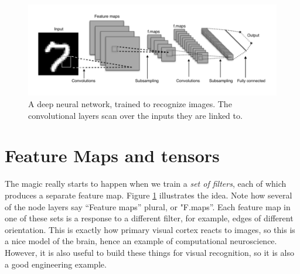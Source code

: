


\begin{figure}[h]
\centering
\includegraphics[scale=.45]{./images/deepNet.png}
\caption[Adapted from a creative commons image by Aphex34 at \url{https://commons.wikimedia.org/wiki/File:Typical_cnn.png} ]{A deep neural network, trained to recognize images. The convolutional layers scan over the inputs they are linked to. }
\label{deep_net2}
\end{figure}


\section{Feature Maps and tensors}

The magic really starts to happen when we train a \emph{set of filters}, each of which produces a separate feature map.  Figure \ref{deep_net2} illustrates the idea. Note how several of the node layers say ``Feature maps'' plural, or "F.maps''. Each feature map in one of these sets is a response to a different filter, for example, edges of different orientation. This is exactly how primary visual cortex reacts to images, so this is a nice model of the brain, hence an example of computational  neuroscience. However, it is also useful to build these things for visual recognition, so it is also a good engineering example.

